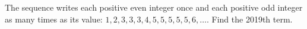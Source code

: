 The sequence writes each positive even integer once and each positive odd integer as many times as its value: $1,2,3,3,3,4,5,5,5,5,5,6,\ldots$. Find the 2019th term.
